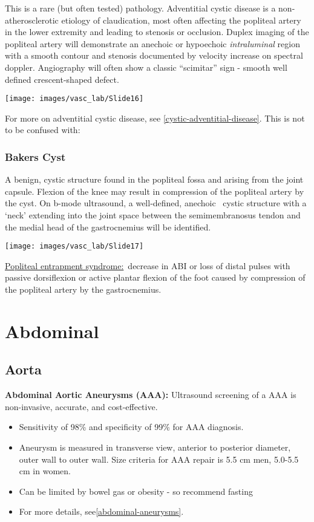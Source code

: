 \documentclass[
]{book}
\begin{document}
This is a rare (but often tested) pathology. Adventitial cystic disease
is a non-atherosclerotic etiology of claudication, most often affecting
the popliteal artery in the lower extremity and leading to stenosis or
occlusion. Duplex imaging of the popliteal artery will demonstrate an
anechoic or hypoechoic \emph{intraluminal} region with a smooth contour and
stenosis documented by velocity increase on spectral doppler.
Angiography will often show a classic ``scimitar'' sign - smooth well
defined crescent-shaped defect.\citep{shaw2007, winn2015}

\texttt{[image: images/vasc\_lab/Slide16]}

For more on adventitial cystic disease, see
\ref{cystic-adventitial-disease}. This is not to be confused with:

\hypertarget{bakers-cyst}{%
\subsubsection{Bakers Cyst}\label{bakers-cyst}}

A benign, cystic structure found in the popliteal fossa and arising from
the joint capsule. Flexion of the knee may result in compression of the
popliteal artery by the cyst. On b-mode ultrasound, a well-defined,
anechoic~ cystic structure with a `neck' extending into the joint space
between the semimembranosus tendon and the medial head of the
gastrocnemius will be identified.

\texttt{[image: images/vasc\_lab/Slide17]}

\uline{Popliteal entrapment syndrome:}~decrease in ABI or loss of
distal pulses with passive dorsiflexion or active plantar flexion of the
foot caused by compression of the popliteal artery by the gastrocnemius.

\hypertarget{abdominal}{%
\section{Abdominal}\label{abdominal}}

\hypertarget{aorta}{%
\subsection{Aorta}\label{aorta}}

\textbf{Abdominal Aortic Aneurysms (AAA):} Ultrasound screening of a AAA is
non-invasive, accurate, and cost-effective.\citep{chaikof2018}

\begin{itemize}
\item
  Sensitivity of 98\% and specificity of 99\% for AAA
  diagnosis.\citep{wilmink2002}
\item
  Aneurysm is measured in transverse view, anterior to posterior
  diameter, outer wall to outer wall.\citep{iac2021} Size criteria for AAA
  repair is 5.5 cm men, 5.0-5.5 cm in women.
\item
  Can be limited by bowel gas or obesity - so recommend fasting
\item
  For more details, see\ref{abdominal-aneurysms}.
\end{itemize}
\end{document}
